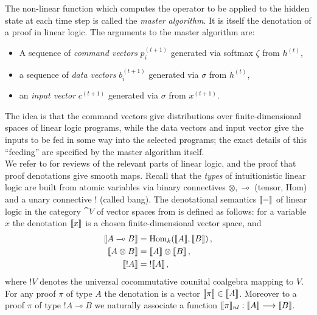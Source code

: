 \documentclass[english,letter paper,12pt,leqno]{article}
\theoremstyle{example}
\numberwithin{equation}{section}
\def\Hom{\operatorname{Hom}}
\begin{document}
The non-linear function which computes the operator to be applied to the hidden state at each time step is called the \emph{master algorithm}. It is itself the denotation of a proof in linear logic. The arguments to the master algorithm are:
\begin{itemize}
\item A sequence of \emph{command vectors} $p_i^{(t+1)}$ generated via softmax $\zeta$ from $h^{(t)}$,
\item a sequence of \emph{data vectors} $b_i^{(t+1)}$ generated via $\sigma$ from $h^{(t)}$,
\item an \emph{input vector} $c^{(t+1)}$ generated via $\sigma$ from $x^{(t+1)}$.
\end{itemize}
The idea is that the command vectors give distributions over finite-dimensional spaces of linear logic programs, while the data vectors and input vector give the inputs to be fed in some way into the selected programs; the exact details of this ``feeding'' are specified by the master algorithm itself.
\\

We refer to \cite{murfet_ll,murfetclift} for reviews of the relevant parts of linear logic, and the proof that proof denotations give smooth maps. Recall that the \emph{types} of intuitionistic linear logic are built from atomic variables via binary connectives $\otimes, \multimap$ (tensor, Hom) and a unary connective ${!}$ (called bang). The denotational semantics $\llbracket - \rrbracket$ of linear logic in the category $\cat{V}$ of vector spaces from \cite[\S 5.1, \S 5.3]{murfet_ll} is defined as follows: for a variable $x$ the denotation $\llbracket x \rrbracket$ is a chosen finite-dimensional vector space, and
\begin{align*}
\den{A \multimap B} &= \Hom_k(\den{A},\den{B})\,,\\
\den{A \otimes B} &= \den{A} \otimes \den{B}\,,\\
\den{{!}A} &= {!} \den{A}\,,
\end{align*}
where ${!} V$ denotes the universal cocommutative counital coalgebra mapping to $V$. For any proof $\pi$ of type $A$ the denotation is a vector $\llbracket \pi \rrbracket \in \llbracket A \rrbracket$. Moreover to a proof $\pi$ of type ${!} A \multimap B$ we naturally associate \cite[Definition 5.10]{murfet_ll} a function $\llbracket \pi \rrbracket_{nl}: \llbracket A \rrbracket \longrightarrow \llbracket B \rrbracket$.
\end{document}
